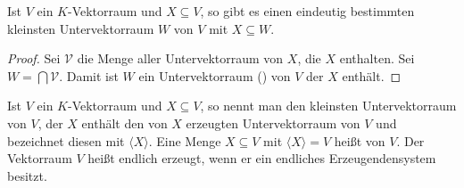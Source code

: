 \begin{proposition}
	Ist $V$ ein $K$-Vektorraum und $X \subseteq V$, so gibt es einen eindeutig bestimmten kleinsten Untervektorraum $W$ von $V$
	mit $X \subseteq W$.
\end{proposition}
\begin{proof}
	Sei $\mathcal V$ die Menge aller Untervektorraum von $X$, die $X$ enthalten. Sei $W=\bigcap \mathcal V$. Damit ist 
	$W$ ein Untervektorraum () von $V$ der $X$ enthält.
\end{proof}

\begin{definition}[Erzeugendensystem]
	Ist $V$ ein $K$-Vektorraum und $X\subseteq V$, so nennt man den kleinsten Untervektorraum von $V$, der $X$ enthält den von $X$ erzeugten Untervektorraum von $V$ und bezeichnet diesen mit $\langle X\rangle$. Eine Menge $X\subseteq V$ mit $\langle X\rangle=V$ heißt  von $V$. Der Vektorraum $V$ heißt endlich erzeugt, wenn er ein endliches Erzeugendensystem besitzt.
\end{definition}